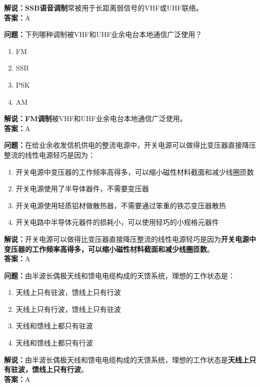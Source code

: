 \textbf{解说：}\textbf{SSB语音调制}常被用于长距离弱信号的VHF或UHF联络。\\\textbf{答案：}A%



\textbf{问题：}下列哪种调制被VHF和UHF业余电台本地通信广泛使用？

\begin{enumerate}[label=\Alph*), leftmargin=1.5cm]
	\item FM
	\item SSB
	\item PSK
	\item AM
\end{enumerate}

\textbf{解说：}\textbf{FM调制}被VHF和UHF业余电台本地通信广泛使用。\\\textbf{答案：}A%



\textbf{问题：}在给业余收发信机供电的整流电源中，开关电源可以做得比变压器直接降压整流的线性电源轻巧是因为：

\begin{enumerate}[label=\Alph*), leftmargin=1.5cm]
	\item 开关电源中变压器的工作频率高得多，可以缩小磁性材料截面和减少线圈匝数
	\item 开关电源使用了半导体器件，不需要变压器
	\item 开关电源使用轻质铝材做散热器，不需要通过笨重的铁芯变压器散热
	\item 开关电路中半导体元器件的损耗小，可以使用轻巧的小规格元器件
\end{enumerate}

\textbf{解说：}开关电源可以做得比变压器直接降压整流的线性电源轻巧是因为\textbf{开关电源中变压器的工作频率高得多，可以缩小磁性材料截面和减少线圈匝数}。\\\textbf{答案：}A%



\textbf{问题：}由半波长偶极天线和馈电电缆构成的天馈系统，理想的工作状态是：

\begin{enumerate}[label=\Alph*), leftmargin=1.5cm]
	\item 天线上只有驻波，馈线上只有行波
	\item 天线上只有行波，馈线上只有驻波
	\item 天线和馈线上都只有驻波
	\item 天线和馈线上都只有行波
\end{enumerate}

\textbf{解说：}由半波长偶极天线和馈电电缆构成的天馈系统，理想的工作状态是\textbf{天线上只有驻波，馈线上只有行波}。\\\textbf{答案：}A%



